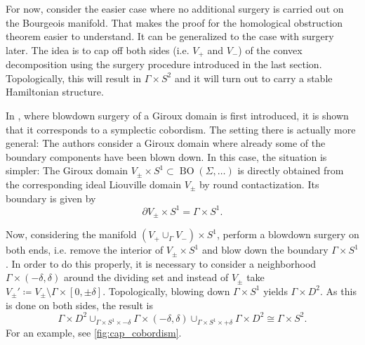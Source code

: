 For now, consider the easier case where no additional surgery is carried out on the Bourgeois manifold.
That makes the proof for the homological obstruction theorem easier to understand.
It can be generalized to the case with surgery later.
The idea is to cap off both sides (i.e. $V_+$ and $V_-$) of the convex decomposition
using the surgery procedure introduced in the last section.
Topologically, this will result in $\Gamma \times S^2$ and 
it will turn out to carry a stable Hamiltonian structure.

In \cite[Section 6]{MNW13}, where blowdown surgery of a Giroux domain is first introduced,
it is shown that it corresponds to a symplectic cobordism.
The setting there is actually more general: The authors consider a Giroux
domain where already some of the boundary components have been blown down.
In this case, the situation is simpler: The Giroux domain 
$V_\pm \times S^1 \subset \operatorname{BO}(\Sigma, \dots)$
is directly obtained from the corresponding ideal Liouville domain $V_\pm$ by 
round contactization.
Its boundary is given by 
\[
    \partial V_\pm \times S^1 = \Gamma \times S^1.
\]

Now, considering the manifold $(V_+ \cup_\Gamma V_-)\times S^1$, perform a blowdown
surgery on both ends, i.e. remove the interior of $V_\pm \times S^1$ and blow down the boundary $\Gamma \times S^1$.
In order to do this properly, it is necessary to consider a neighborhood 
$\Gamma \times (-\delta, \delta)$ around the dividing set and 
instead of $V_\pm$ take $V_\pm' \coloneqq V_\pm \setminus \Gamma \times [0, \pm \delta]$.
Topologically, blowing down $\Gamma \times S^1$ yields $\Gamma \times D^2$.
As this is done on both sides, the result is 
\[
    \Gamma \times D^2 \cup_{\Gamma \times S^1 \times -\delta} \Gamma \times (-\delta,\delta) 
    \cup_{\Gamma \times S^1 \times +\delta} \Gamma \times D^2 \cong \Gamma \times S^2.
\]
For an example, see \cref{fig:cap_cobordism}.


